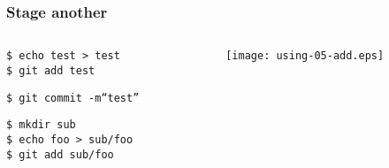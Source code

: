 \documentclass[english]{beamer}
\newcommand{\CMD}[1]{
  \texttt{\textcolor{code-green}{#1}}
}
\newcommand{\cmd}[1]{
  \texttt{\textcolor{code-orange}{#1}}
}
\begin{document}
\begin{frame}
\frametitle{Stage another}
\begin{columns}[t]
        \begin{column}[T]{.5\textwidth}
                \cmd{\$ echo test > test} \\
                \CMD{\$ git add test}

                \vspace{.1\textheight}

                \CMD{\$ git commit -m``test''} \\

                \vspace{.1\textheight}

                \cmd{\$ mkdir sub} \\
                \cmd{\$ echo foo > sub/foo} \\
                \CMD{\$ git add sub/foo}
        \end{column}
        \begin{column}[T]{.5\textwidth}

                \texttt{[image: using-05-add.eps]}

        \end{column}
\end{columns}
\end{frame}
\end{document}
